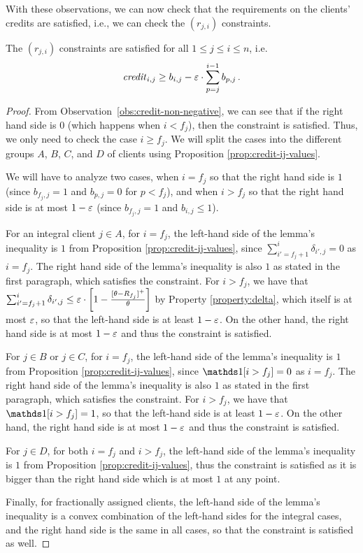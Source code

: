 With these observations, we can now check that the requirements on the clients' credits are satisfied, i.e., we can check the $(r_{j,i})$ constraints.
\begin{lemma}\label{lem:rij-constraints}
    The $(r_{j,i})$ constraints are satisfied for all $1 \leq j \le i \leq n$, i.e. 
    \begin{equation*}
        \text{\emph{credit}}_{i,j} \ge b_{i,j} - \varepsilon \cdot \sum_{p=j}^{i-1} b_{p,j}\,.
    \end{equation*}
\end{lemma}
\begin{proof}
    From Observation~\ref{obs:credit-non-negative}, we can see that if the right hand side is $0$ (which happens when $i<f_j$), then the constraint is satisfied. Thus, we only need to check the case $i \geq f_j$. We will split the cases into the different groups $A$, $B$, $C$, and $D$ of clients using Proposition \ref{prop:credit-ij-values}. 
    
    We will have to analyze two cases, when $i=f_j$ so that the right hand side is $1$ (since $b_{f_j,j} = 1$ and $b_{p,j} = 0$ for $p < f_j$), and when $i > f_j$ so that the right hand side is at most $1-\varepsilon$ (since $b_{f_j,j} = 1$ and $b_{i,j} \leq 1$).

    For an integral client $j\in A$, for $i=f_j$, the left-hand side of the lemma's inequality is $1$ from Proposition \ref{prop:credit-ij-values}, since $\sum_{i'=f_j+1}^i \delta_{i',j} = 0$ as $i=f_j$. The right hand side of the lemma's inequality is also $1$ as stated in the first paragraph, which satisfies the constraint. For $i > f_j$, we have that $\sum_{i'=f_j+1}^i \delta_{i',j} \leq \varepsilon \cdot \left[1 -\frac{[\theta-R_{f_j}]^+}{\theta}\right]$ by Property \ref{property:delta}, which itself is at most $\varepsilon$, so that the left-hand side is at least $1 - \varepsilon$. On the other hand, the right hand side is at most $1 - \varepsilon$ and thus the constraint is satisfied.

    For $j\in B$ or $j\in C$, for $i=f_j$, the left-hand side of the lemma's inequality is $1$ from Proposition \ref{prop:credit-ij-values}, since $\ind[i > f_j] = 0$ as $i=f_j$. The right hand side of the lemma's inequality is also $1$ as stated in the first paragraph, which satisfies the constraint. For $i > f_j$, we have that $\ind[i > f_j] = 1$, so that the left-hand side is at least $1 - \varepsilon$. On the other hand, the right hand side is at most $1 - \varepsilon$ and thus the constraint is satisfied.

    For $j\in D$, for both $i=f_j$ and $i > f_j$, the left-hand side of the lemma's inequality is $1$ from Proposition \ref{prop:credit-ij-values}, thus the constraint is satisfied as it is bigger than the right hand side which is at most $1$ at any point. 

    Finally, for fractionally assigned clients, the left-hand side of the lemma's inequality is a convex combination of the left-hand sides for the integral cases, and the right hand side is the same in all cases, so that the constraint is satisfied as well.
\end{proof}

